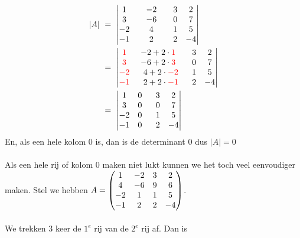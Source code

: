 	\begin{align*}
	|A|  \  & = \ \begin{vmatrix}  1 & & -2 &  & 3 & 2  \\  3 & & -6 & &  0 & 7  \\  -2 & & 4 & &  1 & 5  \\  -1 & & 2 & &  2 & -4 \end{vmatrix} \\
	\  & = \ \begin{vmatrix}  {\color{red}1} & -2+2\cdot {\color{red}1} &  \ \ 3 & 2  \\  {\color{red}3} & -6+2\cdot {\color{red}3} &  \ \ 0 & 7  \\  {\color{red}-2} & \ \ 4+2\cdot {\color{red}-2} &  \ \ 1 & 5  \\  {\color{red}-1} & \ \  2+2\cdot {\color{red}-1} &  \ \ 2 & -4 \end{vmatrix} \\
	\ & = \ \begin{vmatrix}  1 & 0 &  \ \ 3 & 2  \\  3 & 0 &  \ \ 0 & 7  \\  -2 & 0 &  \ \ 1 & 5  \\  -1 & 0 &  \ \ 2 & -4 \end{vmatrix} 
	\end{align*} 
	En, als een hele kolom $0$ is, dan is de determinant $0$ dus $ |A| = 0 $ 	 \\   \\                    
\newpage
Als een hele rij of kolom $0$ maken niet lukt kunnen we het toch veel eenvoudiger maken. 
	Stel we hebben 
	$ A = \begin{pmatrix}  1 & -2 & 3 & 2  \\  4 & -6 & 9 & 6  \\  -2 & 1 & 1 & 5  \\  -1 & 2 & 2 & -4  \end{pmatrix} $. \\ \\
 We trekken $3$ keer de $ 1^e  $ rij van de  $ 2^e $ rij af. Dan is 

